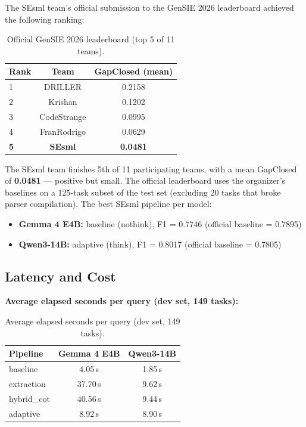 \documentclass{ceurart}
\begin{document}
The SEsml team's official submission to the GenSIE 2026 leaderboard achieved the
following ranking:

\begin{table}
  \caption{Official GenSIE 2026 leaderboard (top 5 of 11 teams).}
  \label{tab:leaderboard-ranking}
  \centering
  \begin{tabular}{lcc}
    \toprule
    Rank & Team & GapClosed (mean) \\
    \midrule
    1 & DRILLER     & 0.2158 \\
    2 & Krishan     & 0.1202 \\
    3 & CodeStrange & 0.0995 \\
    4 & FranRodrigo & 0.0629 \\
    \textbf{5} & \textbf{SEsml} & \textbf{0.0481} \\
    \bottomrule
  \end{tabular}
\end{table}

The SEsml team finishes 5th of 11 participating teams, with a mean GapClosed of
\textbf{0.0481} --- positive but small.
The official leaderboard uses the organizer's baselines on a 125-task subset of the test
set (excluding 20 tasks that broke parser compilation). The best SEsml pipeline per
model:

\begin{itemize}
\item \textbf{Gemma 4 E4B:} baseline (nothink), F1 = 0.7746
  (official baseline = 0.7895)
\item \textbf{Qwen3-14B:} adaptive (think), F1 = 0.8017
  (official baseline = 0.7805)
\end{itemize}

\subsection{Latency and Cost}

\textbf{Average elapsed seconds per query (dev set, 149 tasks):}

\begin{table}
  \caption{Average elapsed seconds per query (dev set, 149 tasks).}
  \label{tab:latency-dev}
  \centering
  \begin{tabular}{lcc}
    \toprule
    Pipeline & Gemma 4 E4B & Qwen3-14B \\
    \midrule
    baseline   & 4.05\,s & 1.85\,s \\
    extraction & 37.70\,s & 9.62\,s \\
    hybrid\_cot & 40.56\,s & 9.44\,s \\
    adaptive   & 8.92\,s & 8.90\,s \\
    \bottomrule
  \end{tabular}
\end{table}
\end{document}
